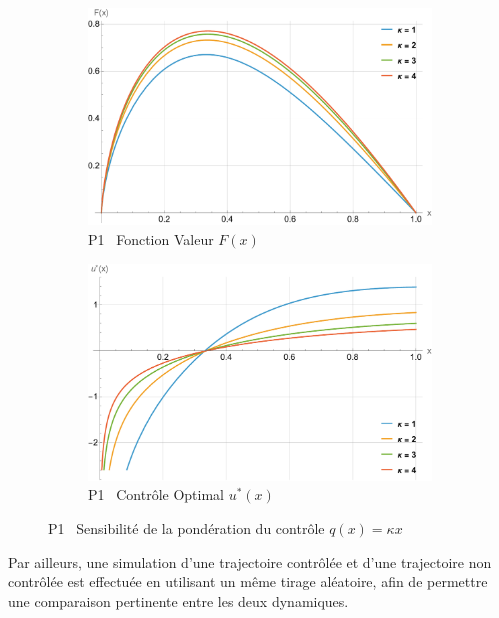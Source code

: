 \FloatBarrier\begin{figure}[htb]
    \centering
    \begin{subfigure}{0.45\linewidth}
        \includegraphics[width=\linewidth]{img/validation/P1/p1_K_value.pdf}
        \caption{P1 \textemdash~Fonction Valeur $F(x)$}\label{fig:KappaValueVisualisation1}
    \end{subfigure}
    \hfill
    \begin{subfigure}{0.45\linewidth}
        \includegraphics[width=\linewidth]{img/validation/P1/p1_K_control.pdf}
        \caption{P1 \textemdash~Contrôle Optimal $u^*(x)$}\label{fig:KappaControlVisualisation1}
    \end{subfigure}
    \caption{P1 \textemdash~Sensibilité de la pondération du contrôle $q(x)=\kappa x$}\label{fig:KappaValueControlComparison1}
\end{figure}
\FloatBarrier Par ailleurs, une simulation d'une trajectoire contrôlée et d'une trajectoire non contrôlée est effectuée en utilisant un même tirage aléatoire, afin de permettre une comparaison pertinente entre les deux dynamiques.
